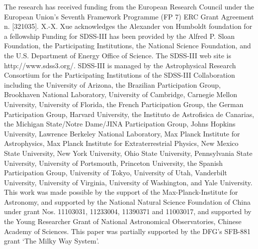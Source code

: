 \documentclass[12pt,preprint]{aastex}
\begin{document}
\acknowledgments
The research has received funding from the European Research Council under the European Union's Seventh Framework Programme (FP 7) ERC Grant Agreement n. [321035].
X.-X. Xue acknowledges the Alexander von Humboldt foundation for a fellowship
Funding for SDSS-III has been provided by the Alfred P. Sloan
Foundation, the Participating Institutions, the National Science
Foundation, and the U.S. Department of Energy Office of Science. The
SDSS-III web site is http://www.sdss3.org/.
SDSS-III is managed by the Astrophysical Research Consortium for the
Participating Institutions of the SDSS-III Collaboration including the
University of Arizona, the Brazilian Participation Group, Brookhaven
National Laboratory, University of Cambridge, Carnegie Mellon
University, University of Florida, the French Participation Group, the
German Participation Group, Harvard University, the Instituto de
Astrofisica de Canarias, the Michigan State/Notre Dame/JINA
Participation Group, Johns Hopkins University, Lawrence Berkeley
National Laboratory, Max Planck Institute for Astrophysics, Max Planck
Institute for Extraterrestrial Physics, New Mexico State University,
New York University, Ohio State University, Pennsylvania State
University, University of Portsmouth, Princeton University, the
Spanish Participation Group, University of Tokyo, University of Utah,
Vanderbilt University, University of Virginia, University of
Washington, and Yale University.
This work was made possible by the support of the Max-Planck-Institute
for Astronomy, and supported by the National Natural Science
Foundation of China under grant Nos. 11103031, 11233004, 11390371 and 11003017,
and supported by the Young Researcher Grant of National Astronomical
Observatories, Chinese Academy of Sciences. This paper was partially
supported by the DFG's SFB-881 grant `The Milky Way System'.


\clearpage
\end{document}
